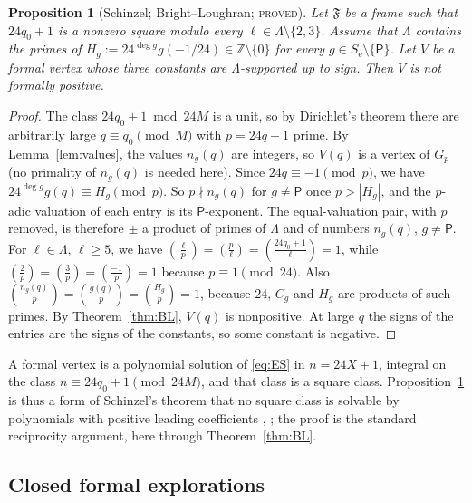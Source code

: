 \documentclass[11pt,reqno]{amsart}
\newtheorem{proposition}[theorem]{Proposition}
\theoremstyle{definition}
\newcommand{\Z}{\mathbb Z}
\newcommand{\Pp}{\mathsf P}
\newcommand{\cF}{\mathfrak F}
\newcommand{\Se}{S_{\mathrm e}}
\newcommand{\leg}[2]{\left(\frac{#1}{#2}\right)}
\newcommand{\status}[1]{\textsc{#1}}
\begin{document}
\begin{proposition}[Schinzel; Bright--Loughran; \status{proved}]\label{prop:schinzel}
Let $\cF$ be a frame such that $24q_0+1$ is a nonzero square modulo every
$\ell\in\Lambda\setminus\{2,3\}$.  Assume that $\Lambda$ contains the primes
of $H_g:=24^{\deg g}g(-1/24)\in\Z\setminus\{0\}$ for every
$g\in\Se\setminus\{\Pp\}$.  Let $V$ be a formal vertex whose three
constants are $\Lambda$-supported up to sign.  Then $V$ is not formally
positive.
\end{proposition}

\begin{proof}
The class $24q_0+1\bmod 24M$ is a unit, so by Dirichlet's theorem there are
arbitrarily large $q\equiv q_0\pmod M$ with $p=24q+1$ prime.  By
Lemma~\ref{lem:values}, the values $n_g(q)$ are integers, so $V(q)$ is a
vertex of $G_p$ (no primality of $n_g(q)$ is needed here).  Since
$24q\equiv-1\pmod p$, we have $24^{\deg g}g(q)\equiv H_g\pmod p$.  So
$p\nmid n_g(q)$ for $g\ne\Pp$ once $p>|H_g|$, and the $p$-adic valuation of
each entry is its $\Pp$-exponent.  The equal-valuation pair, with $p$
removed, is therefore $\pm$ a product of primes of $\Lambda$ and of numbers
$n_g(q)$, $g\ne\Pp$.  For $\ell\in\Lambda$, $\ell\ge5$, we have
$\leg\ell p=\leg p\ell=\leg{24q_0+1}\ell=1$, while
$\leg2p=\leg3p=\leg{-1}p=1$ because $p\equiv1\pmod{24}$.  Also
$\leg{n_g(q)}p=\leg{g(q)}p=\leg{H_g}p=1$, because $24$, $C_g$ and $H_g$
are products of such primes.  By Theorem~\ref{thm:BL}, $V(q)$ is
nonpositive.  At large $q$ the signs of the entries are the signs of the
constants, so some constant is negative.
\end{proof}

A formal vertex is a polynomial solution of \eqref{eq:ES} in $n=24X+1$,
integral on the class $n\equiv24q_0+1\pmod{24M}$, and that class is a
square class.  Proposition~\ref{prop:schinzel} is thus a form of
Schinzel's theorem that no square class is solvable by polynomials with
positive leading coefficients \cite{Schinzel}, \cite[\S1]{ET}; the proof
is the standard reciprocity argument, here through Theorem~\ref{thm:BL}.

\subsection{Closed formal explorations}
\end{document}
